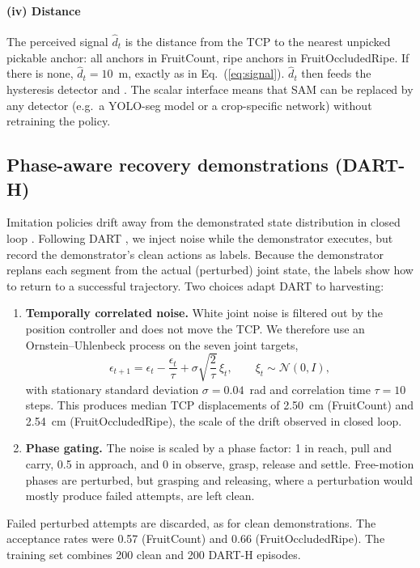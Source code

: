 \paragraph{(iv) Distance} The perceived signal $\hat d_t$ is the distance from the TCP to the nearest unpicked pickable anchor: all anchors in FruitCount, ripe anchors in FruitOccludedRipe. If there is none, $\hat d_t = 10$~m, exactly as in Eq.~(\ref{eq:signal}). $\hat d_t$ then feeds the hysteresis detector and \pekm. The scalar interface means that SAM can be replaced by any detector (e.g.\ a YOLO-seg model or a crop-specific network) without retraining the policy.

\subsection{Phase-aware recovery demonstrations (DART-H)}
\label{sec:dart}
Imitation policies drift away from the demonstrated state distribution in closed loop \citep{ross2011dagger}. Following DART \citep{laskey2017dart}, we inject noise while the demonstrator executes, but record the demonstrator's clean actions as labels. Because the demonstrator replans each segment from the actual (perturbed) joint state, the labels show how to return to a successful trajectory. Two choices adapt DART to harvesting:
\begin{enumerate}
\item \textbf{Temporally correlated noise.} White joint noise is filtered out by the position controller and does not move the TCP. We therefore use an Ornstein--Uhlenbeck process on the seven joint targets,
\begin{equation}
\epsilon_{t+1} = \epsilon_t - \frac{\epsilon_t}{\tau} + \sigma\sqrt{\frac{2}{\tau}}\,\xi_t,\qquad \xi_t \sim \mathcal{N}(0, I),
\end{equation}
with stationary standard deviation $\sigma=0.04$~rad and correlation time $\tau=10$ steps. This produces median TCP displacements of 2.50~cm (FruitCount) and 2.54~cm (FruitOccludedRipe), the scale of the drift observed in closed loop.
\item \textbf{Phase gating.} The noise is scaled by a phase factor: 1 in reach, pull and carry, 0.5 in approach, and 0 in observe, grasp, release and settle. Free-motion phases are perturbed, but grasping and releasing, where a perturbation would mostly produce failed attempts, are left clean.
\end{enumerate}
Failed perturbed attempts are discarded, as for clean demonstrations. The acceptance rates were 0.57 (FruitCount) and 0.66 (FruitOccludedRipe). The training set combines 200 clean and 200 DART-H episodes.

